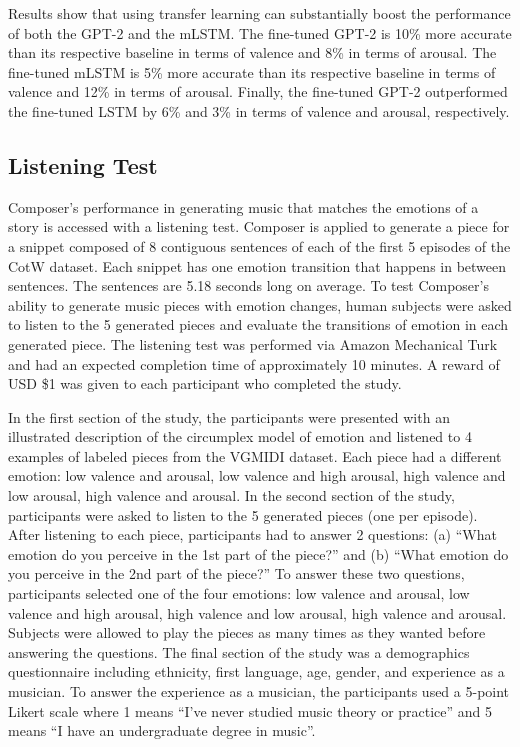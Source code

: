 Results show that using transfer learning can substantially boost the performance of both the GPT-2 and the mLSTM. The fine-tuned GPT-2 is 10\% more accurate than its respective baseline in terms of valence and 8\% in terms of arousal. The fine-tuned mLSTM is 5\% more accurate than its respective baseline in terms of valence and 12\% in terms of arousal. Finally, the fine-tuned GPT-2 outperformed the fine-tuned LSTM by 6\% and 3\% in terms of valence and arousal, respectively.

\subsection{Listening Test}

Composer's performance in generating music that matches the emotions of a story is accessed with a listening test. Composer is applied to generate a piece for a snippet composed of 8 contiguous sentences of each of the first 5 episodes of the CotW dataset. Each snippet has one emotion transition that happens in between sentences. The sentences are 5.18 seconds long on average. To test Composer's ability to generate music pieces with emotion changes, human subjects were asked to listen to the 5 generated pieces and evaluate the transitions of emotion in each generated piece. The listening test was performed via Amazon Mechanical Turk and had an expected completion time of approximately 10 minutes. A reward of USD \$1 was given to each participant who completed the study.

In the first section of the study, the participants were presented with an illustrated description of the circumplex model of emotion and listened to 4 examples of labeled pieces from the VGMIDI dataset. Each piece had a different emotion: low valence and arousal, low valence and high arousal, high valence and low arousal, high valence and arousal. In the second section of the study, participants were asked to listen to the 5 generated pieces (one per episode). After listening to each piece, participants had to answer 2 questions: (a) ``What emotion do you perceive in the 1st part of the piece?'' and (b) ``What emotion do you perceive in the 2nd part of the piece?'' To answer these two questions, participants selected one of the four emotions: low valence and arousal, low valence and high arousal, high valence and low arousal, high valence and arousal. Subjects were allowed to play the pieces as many times as they wanted before answering the questions.
The final section of the study was a demographics questionnaire including ethnicity, first language, age, gender, and experience as a musician. To answer the experience as a musician, the participants used a 5-point Likert scale where 1 means ``I've never studied music theory or practice'' and 5 means ``I have an undergraduate degree in music''.

